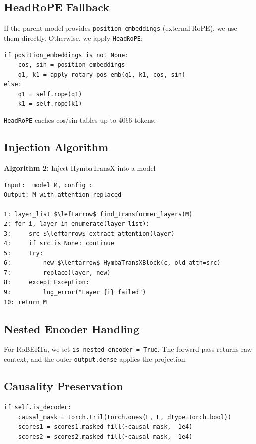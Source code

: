 \subsection{HeadRoPE Fallback}

If the parent model provides \texttt{position\_embeddings} (external RoPE), we use 
them directly. Otherwise, we apply \texttt{HeadRoPE}:

\begin{lstlisting}
if position_embeddings is not None:
    cos, sin = position_embeddings
    q1, k1 = apply_rotary_pos_emb(q1, k1, cos, sin)
else:
    q1 = self.rope(q1)
    k1 = self.rope(k1)
\end{lstlisting}

\texttt{HeadRoPE} caches cos/sin tables up to 4096 tokens.

\subsection{Injection Algorithm}

\textbf{Algorithm 2:} Inject HymbaTransX into a model
\begin{lstlisting}
Input:  model M, config c
Output: M with attention replaced

1: layer_list $\leftarrow$ find_transformer_layers(M)
2: for i, layer in enumerate(layer_list):
3:     src $\leftarrow$ extract_attention(layer)
4:     if src is None: continue
5:     try:
6:         new $\leftarrow$ HymbaTransXBlock(c, old_attn=src)
7:         replace(layer, new)
8:     except Exception:
9:         log_error("Layer {i} failed")
10: return M
\end{lstlisting}

\subsection{Nested Encoder Handling}

For RoBERTa, we set \texttt{is\_nested\_encoder = True}. The forward pass returns 
raw context, and the outer \texttt{output.dense} applies the projection.

\subsection{Causality Preservation}

\begin{lstlisting}
if self.is_decoder:
    causal_mask = torch.tril(torch.ones(L, L, dtype=torch.bool))
    scores1 = scores1.masked_fill(~causal_mask, -1e4)
    scores2 = scores2.masked_fill(~causal_mask, -1e4)
\end{lstlisting}

